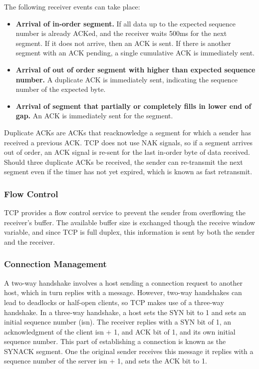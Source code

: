 \documentclass[12pt,titlepage]{article}
\begin{document}
        The following receiver events can take place:
        \begin{itemize}
          \item \textbf{Arrival of in-order segment.} If all data up to the expected sequence number is already ACKed, and the receiver waits 500ms for the next segment. If it does not
            arrive, then an ACK is sent. If there is another segment with an ACK pending, a single cumulative ACK is immediately sent.
          \item \textbf{Arrival of out of order segment with higher than expected sequence number.} A duplicate ACK is immediately sent, indicating the sequence number of the expected byte.
          \item \textbf{Arrival of segment that partially or completely fills in lower end of gap.} An ACK is immediately sent for the segment.
        \end{itemize}

        Duplicate ACKs are ACKs that reacknowledge a segment for which a sender has received a previous ACK. TCP does not use NAK signals, so if a segment arrives out of order, an ACK signal
        is re-sent for the last in-order byte of data received. Should three duplicate ACKs be received, the sender can re-transmit the next segment even if the timer has not yet expired,
        which is known as fast retransmit.

      \subsubsection{Flow Control}
        TCP provides a flow control service to prevent the sender from overflowing the receiver's buffer. The available buffer size is exchanged though the receive window variable, and since
        TCP is full duplex, this information is sent by both the sender and the receiver.

      \subsubsection{Connection Management}
        A two-way handshake involves a host sending a connection request to another host, which in turn replies with a message. However, two-way handshakes can lead to deadlocks or half-open
        clients, so TCP makes use of a three-way handshake. In a three-way handshake, a host sets the SYN bit to 1 and sets an initial sequence number (isn). The receiver replies with a
        SYN bit of 1, an acknowledgment of the client isn + 1, and ACK bit of 1, and its own initial sequence number. This part of establishing a connection is known as the SYNACK segment.
        One the original sender receives this message it replies with a sequence number of the server isn + 1, and sets the ACK bit to 1.
\end{document}
